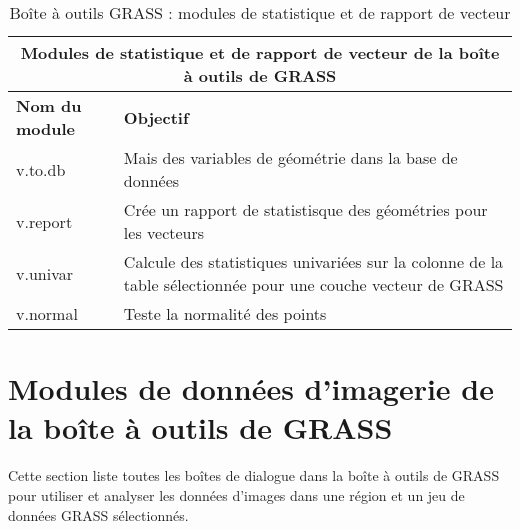 \begin{table}[H]
\centering
 \begin{tabular}{|p{3cm}|p{11cm}|}
  \hline \multicolumn{2}{|c|}{\textbf{Modules de statistique et de rapport de vecteur de la boîte à outils de GRASS}} \\
  \hline \textbf{Nom du module} & \textbf{Objectif} \\
  \hline v.to.db & Mais des variables de géométrie dans la base de données\\
  \hline v.report & Crée un rapport de statistisque des géométries pour les vecteurs\\
  \hline v.univar & Calcule des statistiques univariées sur la colonne de la table sélectionnée pour une couche vecteur de GRASS\\
  \hline v.normal & Teste la normalité des points\\
\hline
\end{tabular}
\caption{Boîte à outils GRASS : modules de statistique et de rapport de vecteur}
\end{table}

\section{Modules de données d'imagerie de la boîte à outils de GRASS}

Cette section liste toutes les boîtes de dialogue dans la boîte à outils de GRASS pour utiliser et analyser les données d'images dans une région et un jeu de données GRASS sélectionnés.

